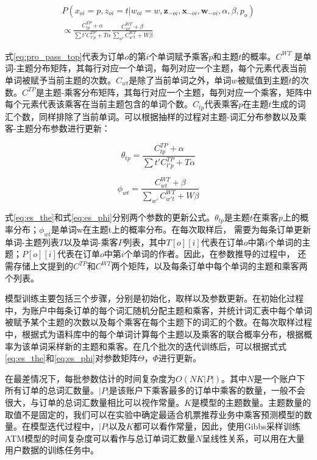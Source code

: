 \begin{eqnarray}
\label{eq:pro_pass_top}
P(x_{oi}=p,z_{oi}=t|w_{oi}=w,\mathbf{z}_{-oi},\mathbf{x}_{-oi},\mathbf{w}_{-oi},\alpha,\beta,p_o) \nonumber\\
\propto \frac{C_{tp}^{TP}+\alpha}{\sum{t'}C_{t'p}^{TP}+T\alpha}\frac{C_{wt}^{WT}+\beta}{\sum_{w'}C_{w't}^{WT}+W\beta}
\end{eqnarray}

式\ref{eq:pro_pass_top}代表为订单$o$的第$i$个单词赋予乘客$p$和主题$t$的概率。$C^{WT}$ 是单词-主题分布矩阵，其每行对应一个单词，每列对应一个主题，每个元素代表当前单词被赋予当前主题的次数。$C_{wt}$是除了当前单词之外，单词$w$被赋值到主题$t$的次数。$C^{TP}$是主题-乘客分布矩阵，其每行对应一个主题，每列对应一个乘客，矩阵中每个元素代表该乘客在当前主题包含的单词个数。$C_{tp}$代表乘客$p$在主题$t$生成的词汇个数，同样排除了当前单词。可以根据抽样的过程对主题-词汇分布参数以及乘客-主题分布参数进行更新：

\begin{equation}
\label{eq:es_the}
\theta_{tp} = \frac{C_{tp}^{TP}+\alpha}{\sum{t'}C_{t'p}^{TP}+T\alpha}
\end{equation}

\begin{equation}
\label{eq:es_phi}
\phi_{wt} = \frac{C_{wt}^{WT}+\beta}{\sum_{w'}C_{w't}^{WT}+W\beta}
\end{equation}

式\ref{eq:es_the}和式\ref{eq:es_phi}分别两个参数的更新公式。$\theta_{tp}$是主题$t$在乘客$p$上的概率分布；$\phi_{wt}$是单词w在主题t上的概率分布。在每次取样后，
需要为每条订单更新单词-主题列表$T$以及单词-乘客$P$列表，其中$T[o][i]$代表在订单$o$中第$i$个单词的主题；$P[o][i]$代表在订单$o$中第$i$个单词的作者。因此，在参数推导的过程中，
还需存储上文提到的$C^{TP}$和$C^{WT}$两个矩阵，以及每条订单中每个单词的主题和乘客两个列表。


模型训练主要包括三个步骤，分别是初始化，取样以及参数更新。在初始化过程中，为账户中每条订单的每个词汇随机分配主题和乘客，并统计词汇表中每个单词被赋予某个主题的次数以及每个乘客在每个主题下的词汇的个数。在每次取样过程中，根据式\label{eq:p_xz}为语料库中的每个单词计算每个主题以及乘客的联合概率分布，根据概率为该单词采样新的主题和乘客。在几个批次的迭代训练后，可以根据式式\ref{eq:es_the}和\ref{eq:es_phi}对参数矩阵$\Theta$，$\Phi$进行更新。

在最差情况下，每批参数估计的时间复杂度为$O(NK|P|)$。其中$N$是一个账户下所有订单的总词汇数量。$|P|$是该账户下乘客最多的订单中乘客的数量，一般不会很大，与订单的总词汇数量相比可以视作常量。$K$是模型的主题数量。主题数量的取值不是固定的，我们可以在实验中确定最适合机票推荐业务中乘客预测模型的数量。在模型迭代过程中，$|P|$以及$K$都可以看作常量，因此，使用Gibbs采样训练ATM模型的时间复杂度可以看作与总订单词汇数量$N$呈线性关系，可以用在大量用户数据的训练任务中。

